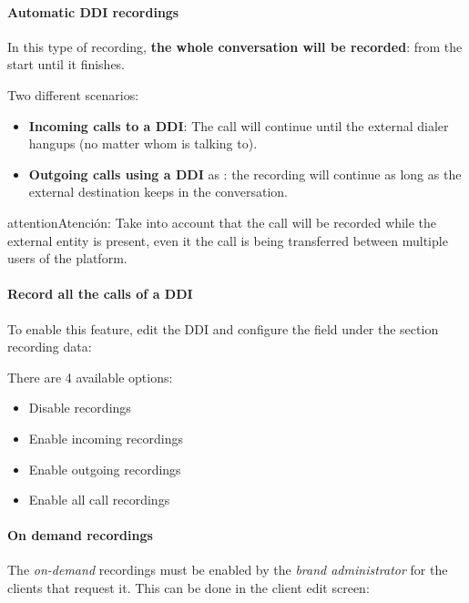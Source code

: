 \documentclass[letterpaper,10pt,spanish]{sphinxmanual}
\begin{document}
\paragraph{Automatic DDI recordings}
\label{administration_portal/client/retail/calls/call_recordings:automatic-ddi-recordings}
In this type of recording, \textbf{the whole conversation will be recorded}: from
the start until it finishes.

Two different scenarios:
\begin{itemize}
\item {} 
\textbf{Incoming calls to a DDI}: The call will continue until the external
dialer hangups (no matter whom is talking to).

\item {} 
\textbf{Outgoing calls using a DDI} as {\hyperref[administration_portal/client/vpbx/ddis:ddis]{}}: the
recording will continue as long as the external destination keeps in the
conversation.

\end{itemize}

\begin{notice}{attention}{Atención:}
Take into account that the call will be recorded while the
external entity is present, even it the call is being transferred between
multiple users of the platform.
\end{notice}
\paragraph{Record all the calls of a DDI}

To enable this feature, edit the DDI and configure the field under the section
recording data:

There are 4 available options:
\begin{itemize}
\item {} 
Disable recordings

\item {} 
Enable incoming recordings

\item {} 
Enable outgoing recordings

\item {} 
Enable all call recordings

\end{itemize}


\paragraph{On demand recordings}
\label{administration_portal/client/retail/calls/call_recordings:on-demand-recordings}
The \emph{on-demand} recordings must be enabled by the \emph{brand administrator} for the
clients that request it. This can be done in the client edit screen:
\end{document}

